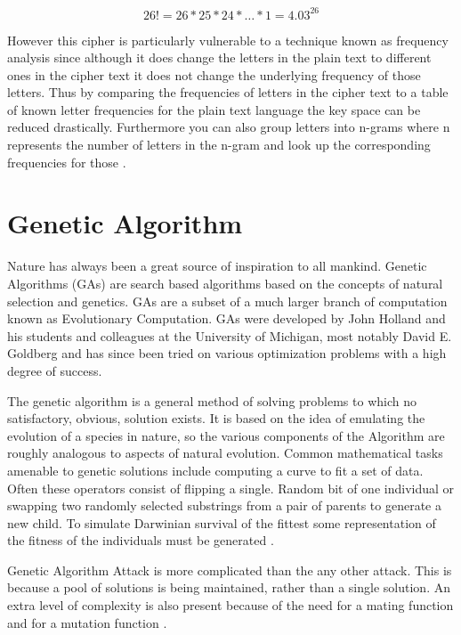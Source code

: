 \begin{equation} 26!= 26 * 25 * 24 * … * 1 = 4.03^{26} \end{equation}

However this cipher is particularly vulnerable to a technique known as frequency analysis since although it
does change the letters in the plain text to different ones in the cipher text it does not change the
underlying frequency of those letters.
Thus by comparing the frequencies of letters in the cipher text to a table of known letter frequencies for
the plain text language the key space can be reduced drastically. Furthermore you can also group letters
into n-grams where n represents the number of letters in the n-gram and look up the corresponding
frequencies for those \cite{brownbridge2007decrypting}. 
\newpage
\section{Genetic Algorithm}
Nature has always been a great source of inspiration to all mankind. Genetic Algorithms (GAs) are search based algorithms based on the concepts of natural selection and genetics. GAs are a subset of a much larger branch of computation known as Evolutionary Computation\cite{GAs}.
GAs were developed by John Holland and his students and colleagues at the University of Michigan, most notably David E. Goldberg and has since been tried on various optimization problems with a high degree of success\cite{GAs}.

The genetic algorithm is a general method of solving problems to
which no satisfactory, obvious, solution exists. It is based on the idea of
emulating the evolution of a species in nature, so the various components
of the Algorithm are roughly analogous to aspects of natural evolution.
Common mathematical tasks amenable to genetic solutions include
computing a curve to fit a set of data. Often these operators consist of
flipping a single.
Random bit of one individual or swapping two randomly selected
substrings from a pair of parents to generate a new child. To simulate
Darwinian survival of the fittest some representation of the fitness of the
individuals must be generated \cite{toemeh2007breaking}.

Genetic Algorithm Attack is more complicated than the  any other attack. This is because a pool of solutions is being maintained, rather than a single solution.
An extra level of complexity is also present because of the
need for a mating function and for a mutation function \cite{dimovski2003attacks}.

